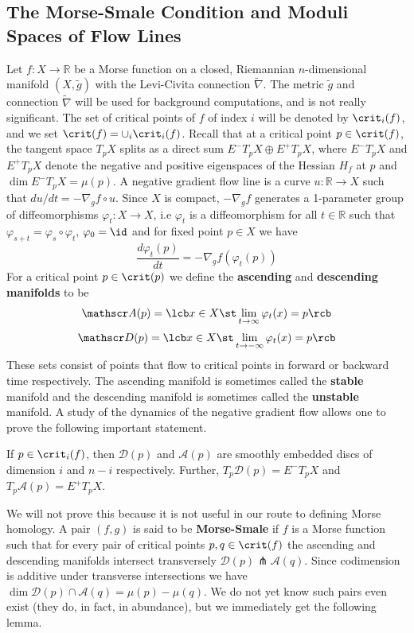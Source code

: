 \subsection{The Morse-Smale Condition and Moduli Spaces of Flow Lines}
\label{The Morse-Smale Condition and Moduli Spaces of Flow Lines}



Let $f : X \rightarrow \mathbb R$ be a Morse function on a closed, Riemannian $n$-dimensional manifold $(X,\widetilde g)$ with the Levi-Civita connection $\widetilde\nabla$. The metric $\widetilde g$ and connection $\widetilde\nabla$ will be used for background computations, and is not really significant. The set of critical points of $f$ of index $i$ will be denoted by $\crit_i(f)$, and we set $\crit(f)=\cup_i \crit_i(f)$. Recall that at a critical point $p \in \crit(f)$, the tangent space $T_p X$ splits as a direct sum $E^-T_pX \oplus E^+T_pX$, where $E^-T_pX$ and $E^+T_pX$ denote the negative and positive eigenspaces of the Hessian $H_f$ at $p$ and $\dim E^-T_pX = \mu(p)$. A negative gradient flow line is a curve $u : \mathbb R \rightarrow X$ such that $du/dt = -\nabla_g f \circ u$. Since $X$ is compact, $-\nabla_g f$ generates a 1-parameter group of diffeomorphisms $\varphi_t : X \rightarrow X$, i.e $\varphi_t$ is a diffeomorphism for all $t \in \mathbb R$ such that $\varphi_{s+t} = \varphi_s \circ \varphi_t$, $\varphi_0=\id$ and for fixed point $p \in X$ we have 
\[ \frac{d\varphi_t(p)}{dt} = -\nabla_g f(\varphi_t(p)) \]
For a critical point $p \in \crit(p)$ we define the \textbf{ascending} and \textbf{descending manifolds} to be
\[ \mathscr A(p) = \lcb x \in X \st \lim_{t \to \infty}  \varphi_t(x) = p \rcb \]
\[ \mathscr D(p) = \lcb x \in X \st \lim_{t \to -\infty} \varphi_t(x) = p \rcb \]
These sets consist of points that flow to critical points in forward or backward time respectively. The ascending manifold is sometimes called the \textbf{stable} manifold and the descending manifold is sometimes called the \textbf{unstable} manifold. A study of the dynamics of the negative gradient flow allows one to prove the following important statement.
\begin{prop}
\label{ascending and descending manifolds are manifolds}
If $p \in \crit_i(f)$, then $\mathscr D(p)$ and $\mathscr A(p)$ are smoothly embedded discs of dimension $i$ and $n-i$ respectively. Further, $T_p \mathscr D(p) = E^- T_pX$ and $T_p \mathscr A(p) = E^+ T_pX$.
\end{prop}
We will not prove this because it is not useful in our route to defining Morse homology. A pair $(f,g)$ is said to be \textbf{Morse-Smale} if $f$ is a Morse function such that for every pair of critical points $p,q \in \crit(f)$ the ascending and descending manifolds intersect transversely $\mathscr D(p) \pitchfork \mathscr A(q)$. Since codimension is additive under transverse intersections we have $\dim \mathscr D(p) \cap \mathscr A(q) = \mu(p)-\mu(q)$. We do not yet know such pairs even exist (they do, in fact, in abundance), but we immediately get the following lemma.
